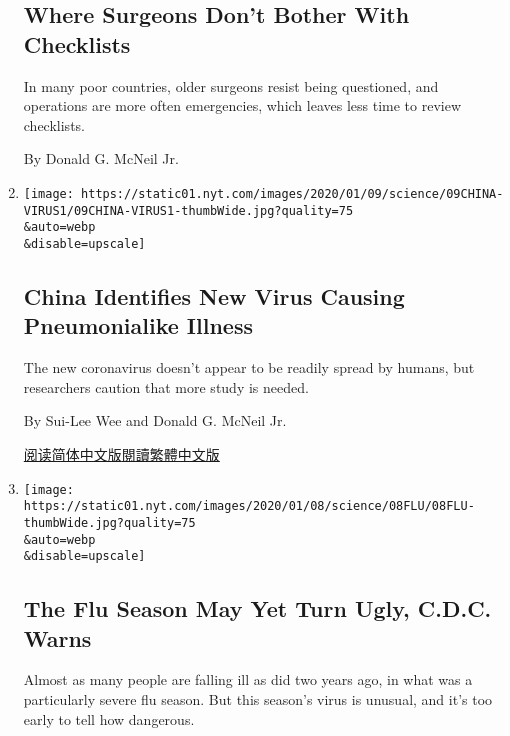 \begin{enumerate}
  \hypertarget{where-surgeons-dont-bother-with-checklists}{%
  \subsection{Where Surgeons Don't Bother With
  Checklists}\label{where-surgeons-dont-bother-with-checklists}}

  In many poor countries, older surgeons resist being questioned, and
  operations are more often emergencies, which leaves less time to
  review checklists.

  By Donald G. McNeil Jr.
\item
  \href{/2020/01/08/health/china-pneumonia-outbreak-virus.html}{}

  \texttt{[image: https://static01.nyt.com/images/2020/01/09/science/09CHINA-VIRUS1/09CHINA-VIRUS1-thumbWide.jpg?quality=75\\\&auto=webp\\\&disable=upscale]}

  \hypertarget{china-identifies-new-virus-causing-pneumonialike-illness}{%
  \subsection{China Identifies New Virus Causing Pneumonialike
  Illness}\label{china-identifies-new-virus-causing-pneumonialike-illness}}

  The new coronavirus doesn't appear to be readily spread by humans, but
  researchers caution that more study is needed.

  By Sui-Lee Wee and Donald G. McNeil Jr.

  \href{https://cn.nytimes.com/china/20200109/china-pneumonia-outbreak-virus/}{阅读简体中文版}\href{https://cn.nytimes.com/china/20200109/china-pneumonia-outbreak-virus/zh-hn}{閱讀繁體中文版}
\item
  \href{/2020/01/08/health/flu-season-severity.html}{}

  \texttt{[image: https://static01.nyt.com/images/2020/01/08/science/08FLU/08FLU-thumbWide.jpg?quality=75\\\&auto=webp\\\&disable=upscale]}

  \hypertarget{the-flu-season-may-yet-turn-ugly-cdc-warns}{%
  \subsection{The Flu Season May Yet Turn Ugly, C.D.C.
  Warns}\label{the-flu-season-may-yet-turn-ugly-cdc-warns}}

  Almost as many people are falling ill as did two years ago, in what
  was a particularly severe flu season. But this season's virus is
  unusual, and it's too early to tell how dangerous.


\end{enumerate}

